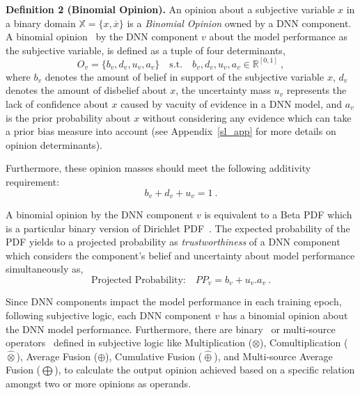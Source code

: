 \vspace{.2cm}
\noindent\textbf{Definition 2 (Binomial Opinion).} An opinion about a subjective variable $x$ in a binary domain $\mathbb{X}=\{x,\overline{x}\}$ is a \emph{Binomial Opinion} owned by a DNN component. A binomial opinion~\cite{sl} by the DNN component $v$ about the model performance as the subjective variable, is defined as a tuple of four determinants, %
\begin{equation}
    O_{v} = \{b_{v},d_{v},u_{v},a_{v}\} \quad \text{s.t.} \quad b_v,d_v,u_v,a_v \in \mathbb{R}^{[0, 1]}\ ,
\label{op}
\end{equation}
where $b_v$ denotes the amount of belief in support of the subjective variable $x$, $d_v$ denotes the amount of disbelief about $x$, the uncertainty mass $u_v$ represents the lack of confidence about $x$ caused by vacuity of evidence in a DNN model, and $a_v$ is the prior probability about $x$ without considering any evidence which can take a prior bias measure into account (see Appendix~\ref{sl_app} for more details on opinion determinants). 

Furthermore, these opinion masses should meet the following additivity requirement: 
\begin{equation}
b_v + d_v + u_v = 1\ .
\label{additivity}
\end{equation}

A binomial opinion by the DNN component $v$ is equivalent to a Beta PDF which is a particular binary version of Dirichlet PDF~\cite{sl}. The expected probability of the PDF yields to a projected probability as \emph{trustworthiness} of a DNN component which considers the component's belief and uncertainty about model performance simultaneously as,
\begin{equation}
    \text{Projected Probability:} \quad PP_v = b_v + u_v.a_v\ .
\label{projprob}
\end{equation}

Since DNN components impact the model performance in each training epoch, following subjective logic, each DNN component $v$ has a binomial opinion about the DNN model performance. Furthermore, there are binary~\cite{sl} or multi-source operators~\cite{multi1} defined in subjective logic like Multiplication ($\otimes$), Comultiplication ($\widehat{\otimes}$), Average Fusion ($\oplus$), Cumulative Fusion ($\widehat{\oplus}$), and Multi-source Average Fusion ($\bigoplus$), to calculate the output opinion achieved based on a specific relation amongst two or more opinions as operands. 

